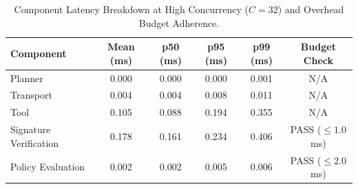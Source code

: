 \begin{table}[t]
\centering
\caption{Component Latency Breakdown at High Concurrency ($C=32$) and Overhead Budget Adherence.}
\label{tab:component_latency}
\small
\begin{tabular}{lccccc}
\toprule
\textbf{Component} & \textbf{Mean (ms)} & \textbf{p50 (ms)} & \textbf{p95 (ms)} & \textbf{p99 (ms)} & \textbf{Budget Check} \\
\midrule
Planner & 0.000 & 0.000 & 0.000 & 0.001 & N/A \\
Transport & 0.004 & 0.004 & 0.008 & 0.011 & N/A \\
Tool & 0.105 & 0.088 & 0.194 & 0.355 & N/A \\
Signature Verification & 0.178 & 0.161 & 0.234 & 0.406 & PASS ($\le 1.0$ms) \\
Policy Evaluation & 0.002 & 0.002 & 0.005 & 0.006 & PASS ($\le 2.0$ms) \\
\bottomrule
\end{tabular}
\end{table}
